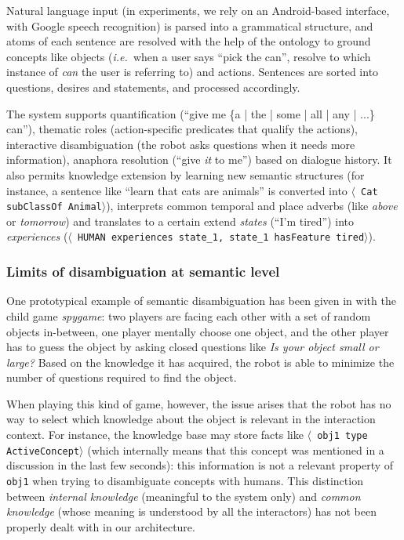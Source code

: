 \documentclass[preprint,12pt]{elsarticle}
\newcommand{\concept}[1]{{\small \texttt{#1}}}
\newcommand{\stmt}[1]{{\footnotesize \tt $\langle$ #1\relax$\rangle$}}
\newcommand{\ie}{{\textit{i.e.\ }}}
\begin{document}
Natural language input (in experiments, we rely on an Android-based interface,
with Google speech recognition) is parsed into a grammatical structure, and
atoms of each sentence are resolved with the help of the ontology to ground
concepts like objects (\ie when a user says ``pick the can'', resolve to which
instance of \emph{can} the user is referring to) and actions. Sentences are
sorted into questions, desires and statements, and processed accordingly.

The system supports quantification (``give me \{a | the | some | all | any |
...\} can''), thematic roles (action-specific predicates that qualify the
actions), interactive disambiguation (the robot asks questions when it needs
more information), anaphora resolution (``give \emph{it} to me'') based on
dialogue history. It also permits knowledge extension by learning new semantic
structures (for instance, a sentence like ``learn that cats are animals'' is
converted into \stmt{Cat subClassOf Animal}), interprets common temporal and
place adverbs (like \emph{above} or \emph{tomorrow}) and translates to a
certain extend \emph{states} (``I'm tired'') into \emph{experiences}
(\stmt{HUMAN experiences state\_1, state\_1 hasFeature tired}).

\subsubsection{Limits of disambiguation at semantic level}

One prototypical example of semantic disambiguation has been given in
\cite{Ros2010b} with the child game \emph{spygame}: two players are facing
each other with a set of random objects in-between, one player mentally choose
one object, and the other player has to guess the object by asking closed
questions like \emph{Is your object small or large?} Based on the knowledge it
has acquired, the robot is able to minimize the number of questions required to
find the object.

When playing this kind of game, however, the issue arises that the robot has no
way to select which knowledge about the object is relevant in the interaction
context. For instance, the knowledge base may store facts like \stmt{obj1 type
ActiveConcept} (which internally means that this concept was mentioned in a
discussion in the last few seconds): this information is not a relevant
property of \concept{obj1} when trying to disambiguate concepts with humans.
This distinction between \emph{internal knowledge} (meaningful to
the system only) and \emph{common knowledge} (whose meaning is understood by
all the interactors) has not been properly dealt with in our architecture.
\end{document}
